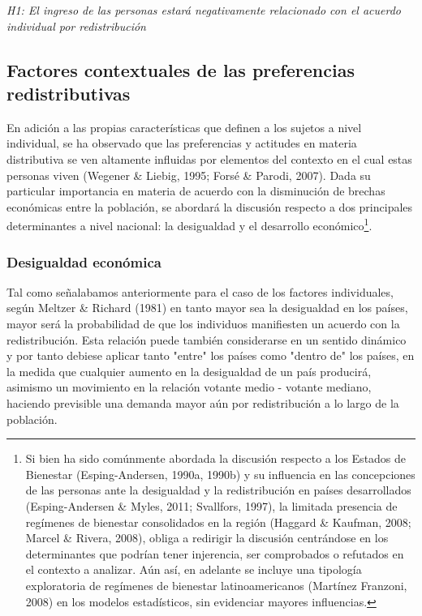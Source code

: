 \documentclass[12pt,letterpaper]{article}
\begin{document}
\textit{H1: El ingreso de las personas estará negativamente relacionado con el acuerdo individual por redistribución}

\subsection{Factores contextuales de las preferencias redistributivas \label{sec:sec22}}

En adición a las propias características que definen a los sujetos a nivel individual, se ha observado que las preferencias y actitudes en materia distributiva se ven altamente influidas por elementos del contexto en el cual estas personas viven (Wegener \& Liebig, 1995; Forsé \& Parodi, 2007). Dada su particular importancia en materia de acuerdo con la disminución de brechas económicas entre la población, se abordará la discusión respecto a dos principales determinantes a nivel nacional: la desigualdad y el desarrollo económico\footnote{Si bien ha sido comúnmente abordada la discusión respecto a los Estados de Bienestar (Esping-Andersen, 1990a, 1990b) y su influencia en las concepciones de las personas ante la desigualdad y la redistribución en países desarrollados (Esping-Andersen \& Myles, 2011; Svallfors, 1997), la limitada presencia de regímenes de bienestar consolidados en la región (Haggard \& Kaufman, 2008; Marcel \& Rivera, 2008), obliga a redirigir la discusión centrándose en los determinantes que podrían tener injerencia, ser comprobados o refutados en el contexto a analizar. Aún así, en adelante se incluye una tipología exploratoria de regímenes de bienestar latinoamericanos (Martínez Franzoni, 2008) en los modelos estadísticos, sin evidenciar mayores influencias.}.

\subsubsection{Desigualdad económica \label{sec:sec221}}

Tal como señalabamos anteriormente para el caso de los factores individuales, según Meltzer \& Richard (1981) en tanto mayor sea la desigualdad en los países, mayor será la probabilidad de que los individuos manifiesten un acuerdo con la redistribución. Esta relación puede también considerarse en un sentido dinámico y por tanto debiese aplicar tanto "entre" los países como "dentro de" los países, en la medida que cualquier aumento en la desigualdad de un país producirá, asimismo un movimiento en la relación votante medio - votante mediano, haciendo previsible una demanda mayor aún por redistribución a lo largo de la población.\\
\end{document}
